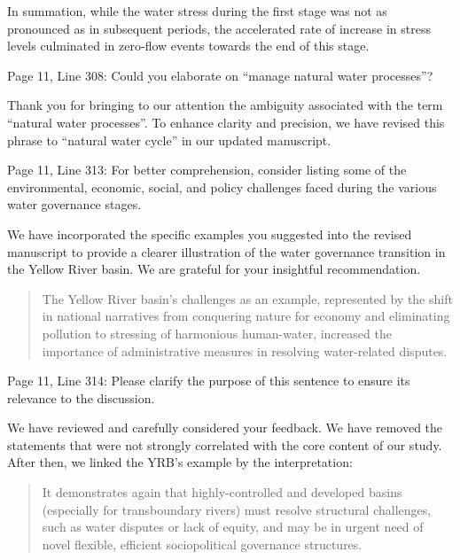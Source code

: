 \AR*{} In summation, while the water stress during the first stage was not as pronounced as in subsequent periods, the accelerated rate of increase in stress levels culminated in zero-flow events towards the end of this stage.

\RC{} Page 11, Line 308: Could you elaborate on ``manage natural water processes''?

\AR{} Thank you for bringing to our attention the ambiguity associated with the term ``natural water processes''. To enhance clarity and precision, we have revised this phrase to ``natural water cycle'' in our updated manuscript.

\RC{} Page 11, Line 313: For better comprehension, consider listing some of the environmental, economic, social, and policy challenges faced during the various water governance stages.

\AR{} We have incorporated the specific examples you suggested into the revised manuscript to provide a clearer illustration of the water governance transition in the Yellow River basin. We are grateful for your insightful recommendation.

\begin{quote}
	The Yellow River basin's challenges as an example, represented by the shift in national narratives from conquering nature for economy and eliminating pollution to stressing of harmonious human-water, increased the importance of administrative measures in resolving water-related disputes.
\end{quote}

\RC{} Page 11, Line 314: Please clarify the purpose of this sentence to ensure its relevance to the discussion.

\AR{} We have reviewed and carefully considered your feedback. We have removed the statements that were not strongly correlated with the core content of our study. After then, we linked the YRB's example by the interpretation:

\begin{quote}
	It demonstrates again that highly-controlled and developed basins (especially for transboundary rivers) must resolve structural challenges, such as water disputes or lack of equity, and may be in urgent need of novel flexible, efficient sociopolitical governance structures.
\end{quote}
